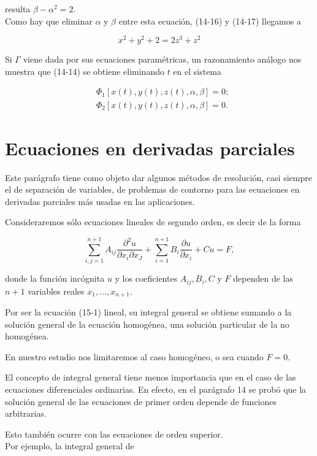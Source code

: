\documentclass[10pt]{article}
\theoremstyle{plain}
\theoremstyle{definition}
\theoremstyle{remark}
\begin{document}
resulta $\beta-\alpha^{2}=2$.\\
Como hay que eliminar $\alpha$ y $\beta$ entre esta ecuación, (14-16) y (14-17) llegamos a

$$
x^{2}+y^{2}+2=2 z^{3}+z^{2}
$$

Si $\Gamma$ viene dada por sus ecuaciones paramétricas, un razonamiento análogo nos muestra que (14-14) se obtiene eliminando $t$ en el sistema

$$
\begin{aligned}
& \Phi_{1}[x(t), y(t), z(t), \alpha, \beta]=0 ; \\
& \Phi_{2}[x(t), y(t), z(t), \alpha, \beta]=0 .
\end{aligned}
$$

\section{Ecuaciones en derivadas parciales}
Este parágrafo tiene como objeto dar algunos métodos de resolución, casi siempre el de separación de variables, de problemas de contorno para las ecuaciones en derivadas parciales más usadas en las aplicaciones.

Consideraremos sólo ecuaciones lineales de segundo orden, es decir de la forma


\begin{equation*}
\sum_{i, j=1}^{n+1} A_{i j} \frac{\partial^{2} u}{\partial x_{i} \partial x_{J}}+\sum_{i=1}^{n+1} B_{i} \frac{\partial u}{\partial x_{i}}+C u=F, \tag{15-1}
\end{equation*}


donde la función incógnita $u$ y los coeficientes $A_{i j}, B_{i}, C$ y $F$ dependen de las $n+1$ variables reales $x_{1}, \ldots, x_{n+1}$.

Por ser la ecuación (15-1) lineal, su integral general se obtiene sumando a la solución general de la ecuación homogénea, una solución particular de la no homogénea.

En nuestro estudio nos limitaremos al caso homogéneo, o sea cuando $F=0$.

El concepto de integral general tiene menos importancia que en el caso de las ecuaciones diferenciales ordinarias. En efecto, en el parágrafo 14 se probó que la solución general de las ecuaciones de primer orden depende de funciones arbitrarias.

Esto también ocurre con las ecuaciones de orden superior.\\
Por ejemplo, la integral general de
\end{document}
